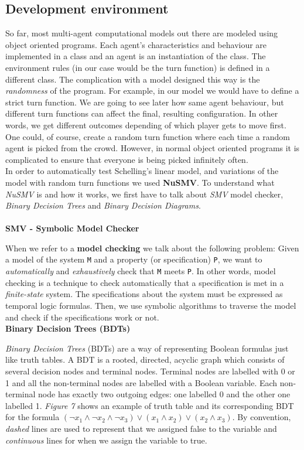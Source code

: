 \documentclass[../main.tex]{subfiles}
\begin{document}
\subsection{Development environment}
So far, most multi-agent computational models out there are modeled using object oriented programs. Each agent's characteristics and behaviour are implemented in a class and an agent is an instantiation of the class. The environment rules (in our case would be the turn function) is defined in a different class. The complication with a model designed this way is the \textit{randomness} of the program. For example, in our model we would have to define a strict turn function. We are going to see later how same agent behaviour, but different turn functions can affect the final, resulting configuration. In other words, we get different outcomes depending of which player gets to move first. One could, of course, create a random turn function where each time a random agent is picked from the crowd. However, in normal object oriented programs it is complicated to ensure that everyone is being picked infinitely often.\\

In order to automatically test Schelling's linear model, and variations of the model with random turn functions we used \textbf{NuSMV}. To understand what \textit{NuSMV} is and how it works, we first have to talk about \textit{SMV} model checker, \textit{Binary Decision Trees} and \textit{Binary Decision Diagrams}.\\ \\

\textbf{SMV - Symbolic Model Checker}

When we refer to a \textbf{model checking} we talk about the following problem: Given a model of the system \verb|M| and a property (or specification) \verb|P|, we want to \textit{automatically} and \textit{exhaustively} check that \verb|M| meets \verb|P|. In other words, model checking is a technique to check automatically that a specification is met in a \textit{finite-state} system. The specifications about the system must be expressed as temporal logic formulas. Then, we use symbolic algorithms to traverse the model and check if the specifications work or not. \\

\textbf{Binary Decision Trees (BDTs)}

\textit{Binary Decision Trees} (BDTs) are a way of representing Boolean formulas just like truth tables. A BDT is a rooted, directed, acyclic graph which consists of several decision nodes and terminal nodes. Terminal nodes are labelled with 0 or 1 and all the non-terminal nodes are labelled with a Boolean variable. Each non-terminal node has exactly two outgoing edges: one labelled 0 and the other one labelled 1. \textit{Figure 7} shows an example of truth table and its corresponding BDT for the formula $ (\neg x_1 \land \neg x_2 \land \neg x_3) \lor (x_1 \land  x_2) \lor(x_2 \land  x_3) $. By convention, \textit{dashed} lines are used to represent that we assigned false to the variable and \textit{continuous} lines for when we assign the variable to true. 
\end{document}
